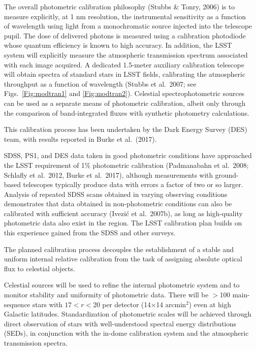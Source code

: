 
The overall photometric calibration philosophy (Stubbs \& Tonry, 2006) is to measure explicitly, at 1 nm resolution, the
instrumental sensitivity as a function of wavelength using light from a monochromatic source injected
into the telescope pupil. The dose of delivered photons is measured using a calibration photodiode whose quantum
efficiency is known to high accuracy. In addition, the LSST system will explicitly measure the atmospheric transmission
spectrum associated with each image acquired. A
dedicated 1.5-meter auxiliary calibration telescope will obtain spectra of
standard stars in LSST fields, calibrating the atmospheric throughput
as a function of wavelength  (Stubbs et al.~2007;
see Figs.~\ref{Fig:modtran1} and \ref{Fig:modtran2}).
Celestial spectrophotometric sources can be used as a separate means of photometric calibration, albeit only through the
comparison of band-integrated fluxes with synthetic photometry calculations.

This calibration process has been undertaken by the Dark Energy Survey (DES) team, with results reported in Burke et al.~(2017).

SDSS, PS1, and DES data
taken in good photometric conditions have approached the LSST
requirement of 1\% photometric calibration
(Padmanabahn et al.~2008; Schlafly et al.~2012, Burke et al.~2017), although measurements with ground-based telescopes
typically produce data with errors a factor of two or so larger. Analysis of
repeated SDSS scans obtained in varying observing conditions demonstrates that data
obtained in
non-photometric conditions can also be calibrated with
sufficient accuracy (Ivezi\'{c} et al.~2007b), as long as high-quality
photometric data also exist in the region.
The LSST calibration plan builds on this experience gained from the SDSS and other surveys.

The planned calibration process decouples the establishment of a stable and uniform internal
relative calibration from the task of assigning absolute optical flux to
celestial objects.

Celestial sources will be used to refine the internal photometric system and
to monitor stability and uniformity of photometric data. There will be
$>$100 main-sequence stars with $17<r<20$ per detector (14$\times$14 arcmin$^2$)
even at high Galactic latitudes. Standardization of photometric scales will be
achieved through direct observation of stars with well-understood spectral
energy distributions (SEDs), in conjunction with the in-dome calibration system and the atmospheric transmission spectra.

